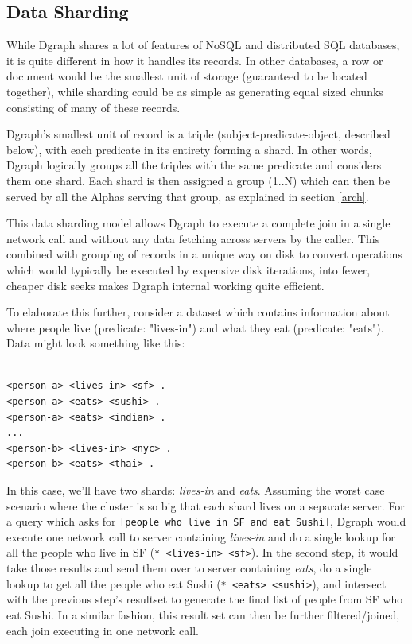 \documentclass[letterpaper,twocolumn,10pt]{article}
\begin{document}
\subsection{Data Sharding}

While Dgraph shares a lot of features of NoSQL and distributed SQL databases, it
is quite different in how it handles its records. In other databases, a row or
document would be the smallest unit of storage (guaranteed to be located
together), while sharding could be as simple as generating equal sized chunks
consisting of many of these records.

Dgraph's smallest unit of record is a triple (subject-predicate-object,
described below), with each predicate in its entirety forming a shard. In other
words, Dgraph logically groups all the triples with the same predicate and
considers them one shard.  Each shard is then assigned a group (1..N) which can
then be served by all the Alphas serving that group, as explained in section
\ref{arch}.

This data sharding model allows Dgraph to execute a complete join in a single
network call and without any data fetching across servers by the caller. This
combined with grouping of records in a unique way on disk to convert operations
which would typically be executed by expensive disk iterations, into fewer,
cheaper disk seeks makes Dgraph internal working quite efficient.

To elaborate this further, consider a dataset which contains information about
where people live (predicate: "lives-in") and what they eat (predicate: "eats").
Data might look something like this:

\begin{verbatim}

<person-a> <lives-in> <sf> .
<person-a> <eats> <sushi> .
<person-a> <eats> <indian> .
...
<person-b> <lives-in> <nyc> .
<person-b> <eats> <thai> .

\end{verbatim}

In this case, we'll have two shards: \textit{lives-in} and \textit{eats}.
Assuming the worst case scenario where the cluster is so big that each shard
lives on a separate server. For a query which asks for \texttt{[people who live in SF
and eat Sushi]}, Dgraph would execute one network call to server containing
\textit{lives-in} and do a single lookup for all the people who live in SF
(\texttt{* <lives-in> <sf>}). In the second step, it would take those results and send them
over to server containing \textit{eats}, do a single lookup to get all the people who
eat Sushi (\texttt{* <eats> <sushi>}), and intersect with the previous step's resultset
to generate the final list of people from SF who eat Sushi. In a similar
fashion, this result set can then be further filtered/joined, each join
executing in one network call.
\end{document}
